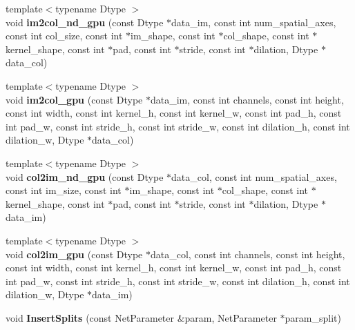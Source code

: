 \begin{DoxyCompactItemize}
\item 
{\footnotesize template$<$typename Dtype $>$ }\\void {\bfseries im2col\+\_\+nd\+\_\+gpu} (const Dtype $\ast$data\+\_\+im, const int num\+\_\+spatial\+\_\+axes, const int col\+\_\+size, const int $\ast$im\+\_\+shape, const int $\ast$col\+\_\+shape, const int $\ast$kernel\+\_\+shape, const int $\ast$pad, const int $\ast$stride, const int $\ast$dilation, Dtype $\ast$data\+\_\+col)\hypertarget{namespacecaffe_a0736a4a69e31bd1393784a01a46a2b09}{}\label{namespacecaffe_a0736a4a69e31bd1393784a01a46a2b09}

\item 
{\footnotesize template$<$typename Dtype $>$ }\\void {\bfseries im2col\+\_\+gpu} (const Dtype $\ast$data\+\_\+im, const int channels, const int height, const int width, const int kernel\+\_\+h, const int kernel\+\_\+w, const int pad\+\_\+h, const int pad\+\_\+w, const int stride\+\_\+h, const int stride\+\_\+w, const int dilation\+\_\+h, const int dilation\+\_\+w, Dtype $\ast$data\+\_\+col)\hypertarget{namespacecaffe_ad5ff36770d0a1de6cc2fcc03d6c6298a}{}\label{namespacecaffe_ad5ff36770d0a1de6cc2fcc03d6c6298a}

\item 
{\footnotesize template$<$typename Dtype $>$ }\\void {\bfseries col2im\+\_\+nd\+\_\+gpu} (const Dtype $\ast$data\+\_\+col, const int num\+\_\+spatial\+\_\+axes, const int im\+\_\+size, const int $\ast$im\+\_\+shape, const int $\ast$col\+\_\+shape, const int $\ast$kernel\+\_\+shape, const int $\ast$pad, const int $\ast$stride, const int $\ast$dilation, Dtype $\ast$data\+\_\+im)\hypertarget{namespacecaffe_a5ff23ac620a3d5539bace03493192ec3}{}\label{namespacecaffe_a5ff23ac620a3d5539bace03493192ec3}

\item 
{\footnotesize template$<$typename Dtype $>$ }\\void {\bfseries col2im\+\_\+gpu} (const Dtype $\ast$data\+\_\+col, const int channels, const int height, const int width, const int kernel\+\_\+h, const int kernel\+\_\+w, const int pad\+\_\+h, const int pad\+\_\+w, const int stride\+\_\+h, const int stride\+\_\+w, const int dilation\+\_\+h, const int dilation\+\_\+w, Dtype $\ast$data\+\_\+im)\hypertarget{namespacecaffe_ab475eb869f36cb9fc5999d48d9bc8451}{}\label{namespacecaffe_ab475eb869f36cb9fc5999d48d9bc8451}

\item 
void {\bfseries Insert\+Splits} (const Net\+Parameter \&param, Net\+Parameter $\ast$param\+\_\+split)\hypertarget{namespacecaffe_a3496a2d5b76ce0e58d9888c9ccace709}{}\label{namespacecaffe_a3496a2d5b76ce0e58d9888c9ccace709}


\end{DoxyCompactItemize}
